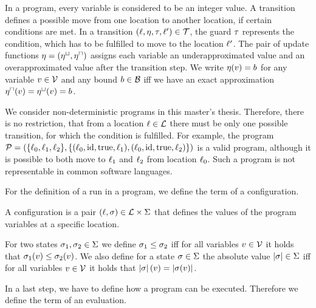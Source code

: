 In a program, every variable is considered to be an integer value.
A transition defines a possible move from one location to another location, if certain conditions are met.
In a transition $(\ell,\eta,\tau,\ell') \in \mathcal{T}$, the guard $\tau$ represents the condition, which has to be fulfilled to move to the location $\ell'$.
The pair of update functions $\eta = (\eta^\sqcup, \eta^\sqcap)$ assigns each variable an underapproximated value and an overapproximated value after the transition step.
We write $\eta(v) = b$ for any variable $v \in \mathcal{V}$ and any bound $b \in \mathcal{B}$ iff we have an exact approximation $\eta^\sqcap(v) = \eta^\sqcup(v) = b$.

We consider non-deterministic programs in this master's thesis.
Therefore, there is no restriction, that from a location $\ell \in \mathcal{L}$ there must be only one possible transition, for which the condition is fulfilled.
For example, the program $\mathcal{P} = (\lbrace \ell_0,\ell_1,\ell_2 \rbrace,\lbrace (\ell_0,\text{id},\text{true},\ell_1),(\ell_0,\text{id},\text{true},\ell_2) \rbrace)$ is a valid program, although it is possible to both move to $\ell_1$ and $\ell_2$ from location $\ell_0$.
Such a program is not representable in common software languages.

For the definition of a run in a program, we define the term of a configuration.

\begin{definition}[Configuration] 
  A configuration is a pair $(\ell, \sigma) \in \mathcal{L} \times \Sigma$ that defines the values of the program variables at a specific location.
\end{definition}

For two states $\sigma_1, \sigma_2 \in \Sigma$ we define $\sigma_1 \leq \sigma_2$ iff for all variables $v \in \mathcal{V}$ it holds that $\sigma_1(v) \leq \sigma_2(v)$.
We also define for a state $\sigma \in \Sigma$ the absolute value $\left|\sigma\right| \in \Sigma$ iff for all variables $v \in \mathcal{V}$ it holds that $\left|\sigma\right|(v) = \left|\sigma(v)\right|$.

In a last step, we have to define how a program can be executed.
Therefore we define the term of an evaluation.

